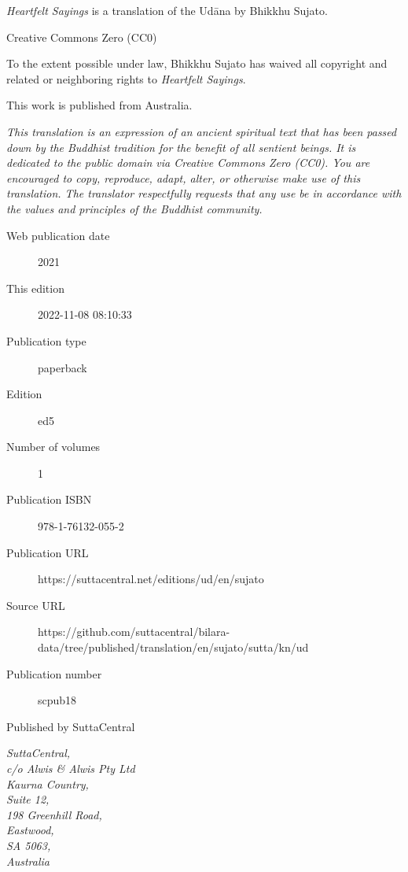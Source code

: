 \documentclass[12pt,openany]{book}%
\begin{document}
\begin{footnotesize}

\textit{Heartfelt Sayings} is a translation of the Udāna by Bhikkhu Sujato.

\medskip

Creative Commons Zero (CC0)

To the extent possible under law, Bhikkhu Sujato has waived all copyright and related or neighboring rights to \textit{Heartfelt Sayings}.

\medskip

This work is published from Australia.

\begin{center}
\textit{This translation is an expression of an ancient spiritual text that has been passed down by the Buddhist tradition for the benefit of all sentient beings. It is dedicated to the public domain via Creative Commons Zero (CC0). You are encouraged to copy, reproduce, adapt, alter, or otherwise make use of this translation. The translator respectfully requests that any use be in accordance with the values and principles of the Buddhist community.}
\end{center}

\medskip

\begin{description}
    \item[Web publication date] 2021
    \item[This edition] 2022-11-08 08:10:33
    \item[Publication type] paperback
    \item[Edition] ed5
    \item[Number of volumes] 1
    \item[Publication ISBN] 978-1-76132-055-2
    \item[Publication URL] https://suttacentral.net/editions/ud/en/sujato
    \item[Source URL] https://github.com/suttacentral/bilara-data/tree/published/translation/en/sujato/sutta/kn/ud
    \item[Publication number] scpub18
\end{description}

\medskip

Published by SuttaCentral

\medskip

\textit{SuttaCentral,\\
c/o Alwis \& Alwis Pty Ltd\\
Kaurna Country,\\
Suite 12,\\
198 Greenhill Road,\\
Eastwood,\\
SA 5063,\\
Australia}

\end{footnotesize}
\end{document}
